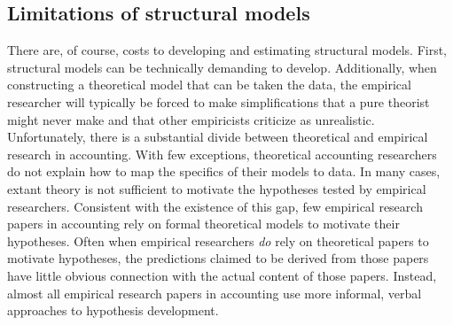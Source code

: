 \subsection{Limitations of structural models}

There are, of course, costs to developing and estimating structural models. 
First, structural models can be technically demanding to develop. 
Additionally, when constructing a theoretical model that can be taken the data, the empirical researcher will typically be forced to make simplifications that a pure theorist might never make and that other empiricists criticize as unrealistic.
Unfortunately, there is a substantial divide between theoretical and empirical research in accounting.
With few exceptions, theoretical accounting researchers do not explain how to map the specifics of their models to data. 
In many cases, extant theory is not sufficient to motivate the hypotheses tested by empirical researchers.
Consistent with the existence of this gap, few empirical research papers in accounting rely on formal theoretical models to motivate their hypotheses. 
Often when empirical researchers \emph{do} rely on theoretical papers to motivate hypotheses, the predictions claimed to be derived from those papers have little obvious connection with the actual content of those papers.
Instead, almost all empirical research papers in accounting use more informal, verbal approaches to hypothesis development.

